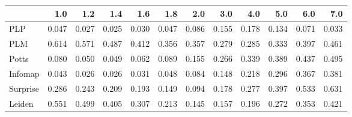\begin{tabular}{lrrrrrrrrrrr}
\toprule
{} &   1.0 &   1.2 &   1.4 &   1.6 &   1.8 &   2.0 &   3.0 &   4.0 &   5.0 &   6.0 &   7.0 \\
\midrule
PLP      & 0.047 & 0.027 & 0.025 & 0.030 & 0.047 & 0.086 & 0.155 & 0.178 & 0.134 & 0.071 & 0.033 \\
PLM      & 0.614 & 0.571 & 0.487 & 0.412 & 0.356 & 0.357 & 0.279 & 0.285 & 0.333 & 0.397 & 0.461 \\
Potts    & 0.080 & 0.050 & 0.049 & 0.062 & 0.089 & 0.155 & 0.266 & 0.339 & 0.389 & 0.437 & 0.495 \\
Infomap  & 0.043 & 0.026 & 0.026 & 0.031 & 0.048 & 0.084 & 0.148 & 0.218 & 0.296 & 0.367 & 0.381 \\
Surprise & 0.286 & 0.243 & 0.209 & 0.193 & 0.149 & 0.094 & 0.178 & 0.277 & 0.397 & 0.533 & 0.631 \\
Leiden   & 0.551 & 0.499 & 0.405 & 0.307 & 0.213 & 0.145 & 0.157 & 0.196 & 0.272 & 0.353 & 0.421 \\
\bottomrule
\end{tabular}
